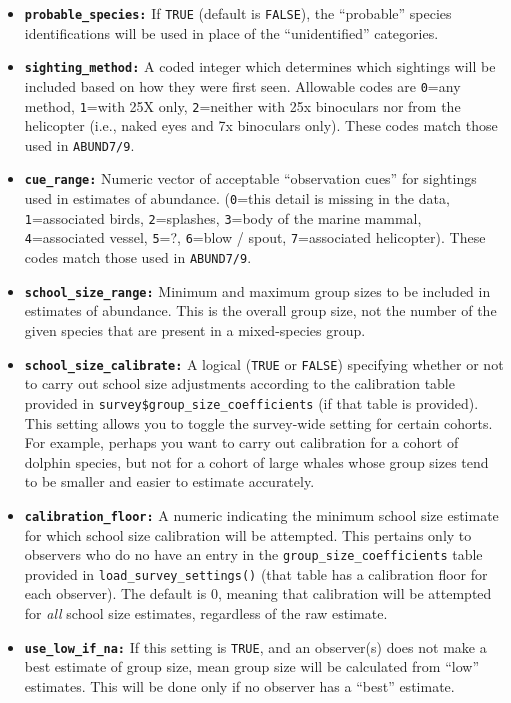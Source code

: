 \documentclass[
]{book}
\begin{document}
\begin{itemize}
\item
  \textbf{\texttt{probable\_species:}} If \texttt{TRUE} (default is \texttt{FALSE}), the ``probable'' species identifications will be used in place of the ``unidentified'' categories.
\item
  \textbf{\texttt{sighting\_method:}} A coded integer which determines which sightings will be included based on how they were first seen. Allowable codes are \texttt{0}=any method, \texttt{1}=with 25X only, \texttt{2}=neither with 25x binoculars nor from the helicopter (i.e., naked eyes and 7x binoculars only). These codes match those used in \texttt{ABUND7/9}.
\item
  \textbf{\texttt{cue\_range:}} Numeric vector of acceptable ``observation cues'' for sightings used in estimates of abundance. (\texttt{0}=this detail is missing in the data, \texttt{1}=associated birds, \texttt{2}=splashes, \texttt{3}=body of the marine mammal, \texttt{4}=associated vessel, \texttt{5}=?, \texttt{6}=blow / spout, \texttt{7}=associated helicopter). These codes match those used in \texttt{ABUND7/9}.
\item
  \textbf{\texttt{school\_size\_range:}} Minimum and maximum group sizes to be included in estimates of abundance. This is the overall group size, not the number of the given species that are present in a mixed-species group.
\item
  \textbf{\texttt{school\_size\_calibrate:}} A logical (\texttt{TRUE} or \texttt{FALSE}) specifying whether or not to carry out school size adjustments according to the calibration table provided in \texttt{survey\$group\_size\_coefficients} (if that table is provided). This setting allows you to toggle the survey-wide setting for certain cohorts. For example, perhaps you want to carry out calibration for a cohort of dolphin species, but not for a cohort of large whales whose group sizes tend to be smaller and easier to estimate accurately.
\item
  \textbf{\texttt{calibration\_floor:}} A numeric indicating the minimum school size estimate for which school size calibration will be attempted. This pertains only to observers who do no have an entry in the \texttt{group\_size\_coefficients} table provided in \texttt{load\_survey\_settings()} (that table has a calibration floor for each observer). The default is 0, meaning that calibration will be attempted for \emph{all} school size estimates, regardless of the raw estimate.
\item
  \textbf{\texttt{use\_low\_if\_na:}} If this setting is \texttt{TRUE}, and an observer(s) does not make a best estimate of group size, mean group size will be calculated from ``low'' estimates. This will be done only if no observer has a ``best'' estimate.

\end{itemize}
\end{document}
